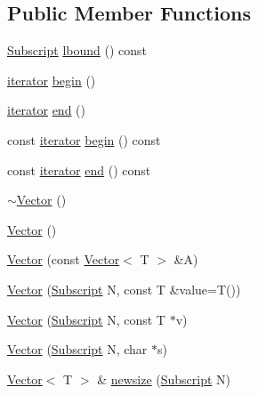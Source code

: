 \subsection*{Public Member Functions}
\begin{DoxyCompactItemize}
\item 
\hyperlink{namespaceTNT_af22e3f1460e145c04ce4e7d701e4c1c1}{Subscript} \hyperlink{classTNT_1_1Vector_a3bc6d4e9cd23b701e377c63fd26c3fcc}{lbound} () const 
\item 
\hyperlink{classTNT_1_1Vector_a7289b2334c4c28181bb4193fa32fc48a}{iterator} \hyperlink{classTNT_1_1Vector_a8be20c12f428f0762ff546d7146141a1}{begin} ()
\item 
\hyperlink{classTNT_1_1Vector_a7289b2334c4c28181bb4193fa32fc48a}{iterator} \hyperlink{classTNT_1_1Vector_a3cf2f31a09a1d5b001e073a07fe13b72}{end} ()
\item 
const \hyperlink{classTNT_1_1Vector_a7289b2334c4c28181bb4193fa32fc48a}{iterator} \hyperlink{classTNT_1_1Vector_ab4495967c00381468e3577bdc9023378}{begin} () const 
\item 
const \hyperlink{classTNT_1_1Vector_a7289b2334c4c28181bb4193fa32fc48a}{iterator} \hyperlink{classTNT_1_1Vector_ad1097f1e627d1d1e20807b2d7e1c6f78}{end} () const 
\item 
\hyperlink{classTNT_1_1Vector_a29e491d8f3a77612be73b6b69c04f060}{$\sim$\-Vector} ()
\item 
\hyperlink{classTNT_1_1Vector_a55481f65669664062299cef9a44f9e2e}{Vector} ()
\item 
\hyperlink{classTNT_1_1Vector_a271230d277812e5233ba912bd5932edc}{Vector} (const \hyperlink{classTNT_1_1Vector}{Vector}$<$ T $>$ \&A)
\item 
\hyperlink{classTNT_1_1Vector_aa329e3e0b9ef92bed1958b31d16742e2}{Vector} (\hyperlink{namespaceTNT_af22e3f1460e145c04ce4e7d701e4c1c1}{Subscript} N, const T \&value=T())
\item 
\hyperlink{classTNT_1_1Vector_ac4709b0750a97e66ecd1ffbf9e45a8ea}{Vector} (\hyperlink{namespaceTNT_af22e3f1460e145c04ce4e7d701e4c1c1}{Subscript} N, const T $\ast$v)
\item 
\hyperlink{classTNT_1_1Vector_a89ae28b74f28b6ba72fbc425937d3603}{Vector} (\hyperlink{namespaceTNT_af22e3f1460e145c04ce4e7d701e4c1c1}{Subscript} N, char $\ast$s)
\item 
\hyperlink{classTNT_1_1Vector}{Vector}$<$ T $>$ \& \hyperlink{classTNT_1_1Vector_a6c02daa35702d244ca08c079ba490864}{newsize} (\hyperlink{namespaceTNT_af22e3f1460e145c04ce4e7d701e4c1c1}{Subscript} N)
\item 

\end{DoxyCompactItemize}
